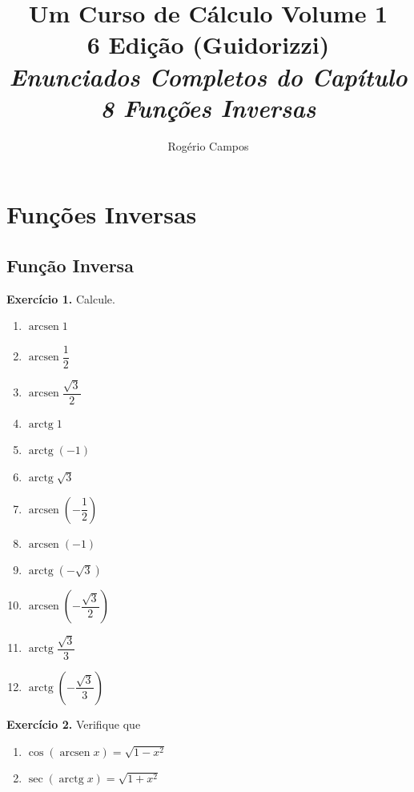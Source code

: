 \documentclass[12pt,a4paper]{article}
\title{
    \Huge \textbf{Um Curso de Cálculo Volume 1} \\
    \vspace{0.3cm}
    \Large 6\textordfeminine{} Edição (Guidorizzi) \\
    \vspace{0.5cm}
    \large \textit{Enunciados Completos do Capítulo 8 Funções Inversas}
}
\author{Rogério Campos}
\begin{document}
\maketitle
\newpage

\tableofcontents
\newpage

\setcounter{section}{7}
\setcounter{subsection}{1}

\section{Funções Inversas}
\subsection{Função Inversa}
\vspace{0.5cm}
\noindent\textbf{Exercício 1.} Calcule.
\begin{enumerate}
    \renewcommand{\theenumi}{\alph{enumi}}
    \renewcommand{\labelenumi}{\theenumi)}
    \item $\operatorname{arcsen} 1$
    \item $\operatorname{arcsen} \dfrac{1}{2}$
    \item $\operatorname{arcsen} \dfrac{\sqrt{3}}{2}$
    \item $\operatorname{arctg} 1$
    \item $\operatorname{arctg} (-1)$
    \item $\operatorname{arctg} \sqrt{3}$
    \item $\operatorname{arcsen} \left(-\dfrac{1}{2}\right)$
    \item $\operatorname{arcsen} (-1)$
    \item $\operatorname{arctg} (-\sqrt{3})$
    \item $\operatorname{arcsen} \left(-\dfrac{\sqrt{3}}{2}\right)$
    \item $\operatorname{arctg} \dfrac{\sqrt{3}}{3}$
    \item $\operatorname{arctg} \left(-\dfrac{\sqrt{3}}{3}\right)$
\end{enumerate}

\vspace{0.5cm}
\noindent\textbf{Exercício 2.} Verifique que
\begin{enumerate}
    \renewcommand{\theenumi}{\alph{enumi}}
    \renewcommand{\labelenumi}{\theenumi)}
    \item $\cos (\operatorname{arcsen} x) = \sqrt{1 - x^2}$
    \item $\sec (\operatorname{arctg} x) = \sqrt{1 + x^2}$
\end{enumerate}
\end{document}
